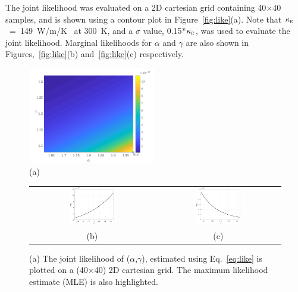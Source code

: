 The joint likelihood was evaluated on a 2D cartesian grid containing 40$\times$40 samples, and is shown
using a contour plot in Figure~\ref{fig:like}(a). Note that 
$\kappa_{\tiny{\mbox{E}}}$~=~149~W/m/K~\cite{Shanks:1963} at 300~K, and a $\sigma$ value, 
0.15$\ast$$\kappa_{\tiny{\mbox{E}}}$, was used to evaluate the joint likelihood.
Marginal likelihoods for  $\alpha$ and $\gamma$ are also
shown in Figures,~\ref{fig:like}(b) and~\ref{fig:like}(c) respectively. 
%
\begin{figure}[htbp]
 \begin{center}
  \includegraphics[width=0.50\textwidth]{./Figures/gl}
  \\ (a) \\
  \begin{tabular}{cc}
  \includegraphics[width=0.37\textwidth]{./Figures/pdf_alpha}
  &
  \includegraphics[width=0.37\textwidth]{./Figures/pdf_gamma}
  \\ (b) & (c)
  \end{tabular}
\caption{(a) The joint likelihood of ($\alpha$,$\gamma$), estimated using Eq.~\ref{eq:like} is plotted
on a (40$\times$40) 2D cartesian grid. The maximum likelihood estimate (MLE) is also highlighted.
}
\end{center}
\end{figure}$$
